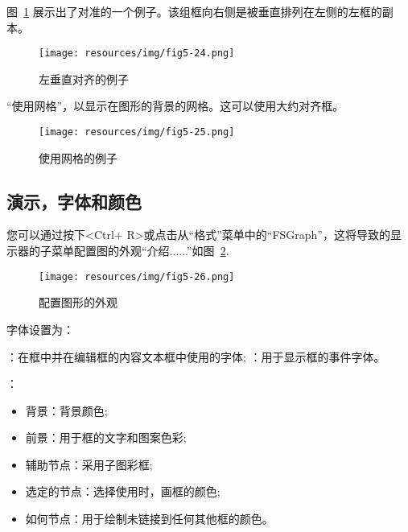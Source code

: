 \bigskip
\noindent 图~\ref{fig-vertical-left-alignment} 展示出了对准的一个例子。该组框向右侧是被垂直排列在左侧的左框的副本。

\bigskip
\begin{figure}[!h]
\begin{center}
\texttt{[image: resources/img/fig5-24.png]}
\caption{左垂直对齐的例子\label{fig-vertical-left-alignment}}
\end{center}
\end{figure}

\bigskip
{}“使用网格”，以显示在图形的背景的网格。这可以使用大约对齐框。

\bigskip
\begin{figure}[!h]
\begin{center}
\texttt{[image: resources/img/fig5-25.png]}
\caption{使用网格的例子}
\end{center}
\end{figure}

\subsection{演示，字体和颜色}
\label{section-display-fonts-colors}
您可以通过按下<Ctrl+ R>或点击从“格式”菜单中的“FSGraph”，这将导致的显示器的子菜单配置图的外观“介绍......”如图~\ref{fig-graph-display-configuration}.

\begin{figure}[!h]
\begin{center}
\texttt{[image: resources/img/fig5-26.png]}
\caption{配置图形的外观\label{fig-graph-display-configuration}}
\end{center}
\end{figure}

\bigskip
\noindent 字体设置为：
\begin{itemize}
  ：在框中并在编辑框的内容文本框中使用的字体;
：用于显示框的事件字体。
\end{itemize}

\bigskip
{}：
\begin{itemize}
  \item 背景：背景颜色;
\item 前景：用于框的文字和图案色彩;
\item 辅助节点：采用子图彩框;
\item 选定的节点：选择使用时，画框的颜色;
\item 如何节点：用于绘制未链接到任何其他框的颜色。\end{itemize}

